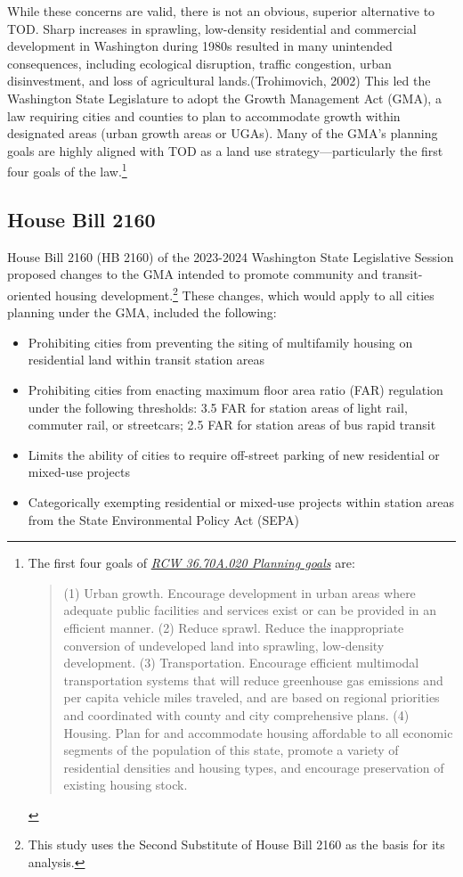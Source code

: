 \documentclass[
]{agujournal2019}
\begin{document}
While these concerns are valid, there is not an obvious, superior
alternative to TOD. Sharp increases in sprawling, low-density
residential and commercial development in Washington during 1980s
resulted in many unintended consequences, including ecological
disruption, traffic congestion, urban disinvestment, and loss of
agricultural lands.(Trohimovich, 2002) This led the Washington State
Legislature to adopt the Growth Management Act (GMA), a law requiring
cities and counties to plan to accommodate growth within designated
areas (urban growth areas or UGAs). Many of the GMA's planning goals are
highly aligned with TOD as a land use strategy---particularly the first
four goals of the law.\footnote{The first four goals of
  \href{https://app.leg.wa.gov/rcw/default.aspx?cite=36.70a.020}{\emph{RCW
  36.70A.020 Planning goals}} are:

  \begin{quote}
  (1) Urban growth. Encourage development in urban areas where adequate
  public facilities and services exist or can be provided in an
  efficient manner. (2) Reduce sprawl. Reduce the inappropriate
  conversion of undeveloped land into sprawling, low-density
  development. (3) Transportation. Encourage efficient multimodal
  transportation systems that will reduce greenhouse gas emissions and
  per capita vehicle miles traveled, and are based on regional
  priorities and coordinated with county and city comprehensive plans.
  (4) Housing. Plan for and accommodate housing affordable to all
  economic segments of the population of this state, promote a variety
  of residential densities and housing types, and encourage preservation
  of existing housing stock.
  \end{quote}}

\subsection{House Bill 2160}\label{house-bill-2160}

House Bill 2160 (HB 2160) of the 2023-2024 Washington State Legislative
Session proposed changes to the GMA intended to promote community and
transit-oriented housing development.\footnote{This study uses the
  Second Substitute of House Bill 2160 as the basis for its analysis.}
These changes, which would apply to all cities planning under the GMA,
included the following:

\begin{itemize}
\item
  Prohibiting cities from preventing the siting of multifamily housing
  on residential land within transit station areas
\item
  Prohibiting cities from enacting maximum floor area ratio (FAR)
  regulation under the following thresholds: 3.5 FAR for station areas
  of light rail, commuter rail, or streetcars; 2.5 FAR for station areas
  of bus rapid transit
\item
  Limits the ability of cities to require off-street parking of new
  residential or mixed-use projects
\item
  Categorically exempting residential or mixed-use projects within
  station areas from the State Environmental Policy Act (SEPA)
\end{itemize}
\end{document}
